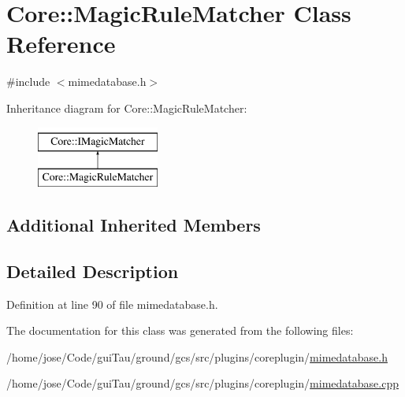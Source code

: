\hypertarget{class_core_1_1_magic_rule_matcher}{\section{Core\-:\-:Magic\-Rule\-Matcher Class Reference}
\label{class_core_1_1_magic_rule_matcher}
}


{\ttfamily \#include $<$mimedatabase.\-h$>$}

Inheritance diagram for Core\-:\-:Magic\-Rule\-Matcher\-:\begin{figure}[H]
\begin{center}
\leavevmode
\includegraphics[height=2.000000cm]{class_core_1_1_magic_rule_matcher}
\end{center}
\end{figure}
\subsection*{Additional Inherited Members}


\subsection{Detailed Description}


Definition at line 90 of file mimedatabase.\-h.



The documentation for this class was generated from the following files\-:\begin{DoxyCompactItemize}
\item 
/home/jose/\-Code/gui\-Tau/ground/gcs/src/plugins/coreplugin/\hyperlink{mimedatabase_8h}{mimedatabase.\-h}\item 
/home/jose/\-Code/gui\-Tau/ground/gcs/src/plugins/coreplugin/\hyperlink{mimedatabase_8cpp}{mimedatabase.\-cpp}\end{DoxyCompactItemize}
